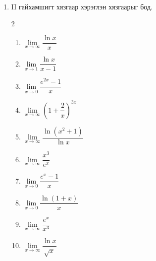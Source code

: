 \begin{enumerate}
\begin{multicols}{2}
\begin{enumerate}
\item $\lim\limits_{n\to \infty}\sqrt[n]{n^2+3}$
\item $\lim\limits_{n\to \infty}\left(1+\dfrac{2}{n}\right)^n$
\item $\lim\limits_{n\to \infty}\dfrac{1}{\sqrt{n}}$
\item $\lim\limits_{n\to \infty}\dfrac{\ln n}{n}$
\item $\lim\limits_{n\to \infty}\dfrac{n}{\ln n}$
\item $\lim\limits_{n\to \infty}\sqrt[n]{3^n+5}$
\item $\lim\limits_{n\to \infty}\dfrac{\sin(1/n)}{1/n}$
\item $\lim\limits_{n\to \infty}(1+\dfrac{1}{n})^{2n}$
\item $\lim\limits_{n\to \infty}\dfrac{(n+1)!}{(n!)^2}$
\item $\lim\limits_{n\to \infty}\dfrac{n^k}{e^n}$ ($k$ тогтмол)
\item $\lim\limits_{n\to \infty}\dfrac{e^n}{n^k}$ ($k$ тогтмол)
\item $\lim\limits_{n\to \infty}\sqrt[n]{n!}$
\item $\lim\limits_{n\to \infty}\dfrac{1+2+\cdots+n}{n^2}$
\item $\lim\limits_{n\to \infty}\dfrac{\sin n}{n^2}$
\end{enumerate}
\end{multicols}
\item II гайхамшигт хязгаар хэрэглэн хязгаарыг бод.
\begin{multicols}{2}
\begin{enumerate}
\item $\lim\limits_{x\to \infty}\dfrac{\ln x}{x}$
\item $\lim\limits_{x\to 1}\dfrac{\ln x}{x-1}$
\item $\lim\limits_{x\to 0}\dfrac{e^{2x}-1}{x}$
\item $\lim\limits_{x\to \infty}\left(1+\dfrac{2}{x}\right)^{3x}$
\item $\lim\limits_{x\to \infty}\dfrac{\ln(x^2+1)}{\ln x}$
\item $\lim\limits_{x\to \infty}\dfrac{x^3}{e^x}$
\item $\lim\limits_{x\to 0}\dfrac{e^x-1}{x}$
\item $\lim\limits_{x\to 0}\dfrac{\ln(1+x)}{x}$
\item $\lim\limits_{x\to \infty}\dfrac{e^x}{x^3}$
\item $\lim\limits_{x\to \infty}\dfrac{\ln x}{\sqrt{x}}$
\end{enumerate}
\end{multicols}
\end{enumerate}
